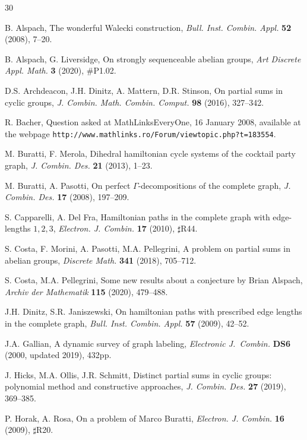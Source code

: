 \documentclass{amsart}
\theoremstyle{definition}
\numberwithin{equation}{section}
\begin{document}
\begin{thebibliography}{30}

B. Alspach,
The wonderful Walecki construction,
\textit{Bull. Inst. Combin. Appl.} \textbf{52} (2008), 7--20.

 B. Alspach, G. Liversidge,
On strongly sequenceable abelian groups,
\textit{Art Discrete Appl. Math.} \textbf{3} (2020), \#P1.02.

 D.S. Archdeacon, J.H. Dinitz, A. Mattern, D.R. Stinson,
On partial sums in cyclic groups,
\textit{J. Combin. Math. Combin. Comput.} \textbf{98} (2016), 327--342.

 R. Bacher,
Question asked at MathLinksEveryOne, 16 January 2008,
available at the webpage \texttt{http://www.mathlinks.ro/Forum/viewtopic.php?t=183554}.

 M. Buratti, F. Merola,
Dihedral hamiltonian cycle systems of the cocktail party graph,
\textit{J. Combin. Des.} \textbf{21} (2013), 1--23.

 M. Buratti, A. Pasotti,
On perfect $\Gamma$-decompositions of the complete graph,
\textit{J. Combin. Des.} \textbf{17} (2008), 197--209.

 S. Capparelli, A. Del Fra,
Hamiltonian paths in the complete graph with edge-lengths $1,2,3$,
\textit{Electron. J. Combin.} \textbf{17} (2010), $\sharp$R44.

 S. Costa, F. Morini, A. Pasotti,  M.A. Pellegrini,
A problem on partial sums in abelian groups,
\textit{Discrete Math.} \textbf{341} (2018), 705--712.

  S. Costa, M.A. Pellegrini,
 Some new results about a conjecture by Brian Alspach,
 \textit{Archiv der Mathematik} \textbf{115} (2020), 479--488.

 J.H. Dinitz, S.R. Janiszewski,
On hamiltonian paths with prescribed edge lengths in the complete graph,
\textit{Bull. Inst. Combin. Appl.} \textbf{57} (2009), 42--52.

 J.A. Gallian,
A dynamic survey of graph labeling,
\textit{Electronic J.~Combin.} \textbf{DS6} (2000, updated 2019), 432pp.

 J. Hicks,  M.A. Ollis,  J.R. Schmitt,
Distinct partial sums in cyclic groups: polynomial method and constructive approaches,
\textit{J. Combin. Des.} \textbf{27} (2019), 369--385.

 P. Horak, A. Rosa,
On a problem of Marco Buratti,
\textit{Electron. J. Combin.} \textbf{16} (2009), $\sharp$R20.


\end{thebibliography}
\end{document}
